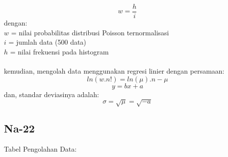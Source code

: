 \documentclass{article}
\begin{document}
		\begin{equation}
		w = \frac{h}{i}
		\end{equation}
		dengan:\\
		$w$ = nilai probabilitas distribusi Poisson ternormalisasi\\
		$i$ = jumlah data (500 data)\\
		$h$ = nilai frekuensi pada histogram\\ \\
		kemudian, mengolah data menggunakan regresi linier dengan persamaan:
		\begin{equation}
		ln(w.n!) = ln(\mu).n-\mu
		\end{equation}
		\begin{equation}
		y = bx+a
		\end{equation}
		dan, standar deviasinya adalah:\\
		\begin{equation}
		\sigma = \sqrt{\mu} = \sqrt{-a}
		\end{equation}
			
			\subsection{Na-22}
			Tabel Pengolahan Data:
			
\end{document}
